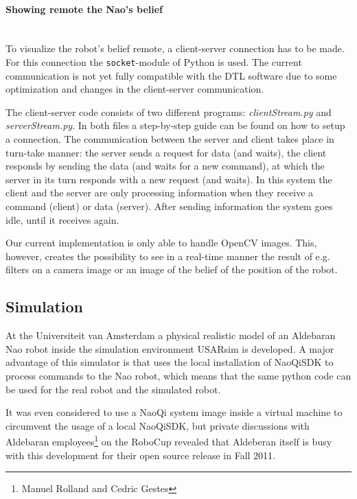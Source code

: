 \documentclass[11pt,a4paper,oneside]{article}
\begin{document}
\paragraph{Showing remote the Nao's belief} \indent \\
To visualize the robot's belief remote, a client-server connection has to be made. For this connection the \texttt{socket}-module of Python is used. The current communication is not yet fully compatible with the DTL software due to some optimization and changes in the client-server communication. 

The client-server code consists of two different programs: \textit{clientStream.py} and \textit{serverStream.py}. In both files a step-by-step guide can be found on how to setup a connection. The communication between the server and client takes place in turn-take manner: the server sends a request for data (and waits), the client responds by sending the data (and waits for a new command), at which the server in its turn responds with a new request (and waits). In this system the client and the server are only processing information when they receive a command (client) or data (server). After sending information the system goes idle, until it receives again.

Our current implementation is only able to handle OpenCV images. This, however, creates the possibility to see in a real-time manner the result of e.g. filters on a camera image or an image of the belief of the position of the robot.


\subsection{Simulation}

At the Universiteit van Amsterdam a physical realistic model of an Aldebaran Nao robot inside the simulation environment USARsim \cite{Carpin2007icra} is developed. A major advantage of this simulator is that uses the local installation of NaoQiSDK to process commands to the Nao robot, which means that the same python code can be used for the real robot and the simulated robot. 

It was even considered to use a NaoQi system image inside a virtual machine to circumvent the usage of a local NaoQiSDK, but private discussions with Aldebaran employees\footnote{Manuel Rolland and Cedric Gestes} on the RoboCup revealed that Aldeberan itself is busy with this development for their open source release in Fall 2011. 
\end{document}
